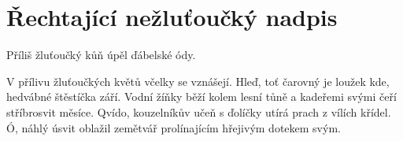 \section*{Řechtající nežluťoučký nadpis}

Příliš žluťoučký kůň úpěl ďábelské ódy.

V přílivu žluťoučkých květů včelky se vznášejí.
Hleď, toť čarovný je loužek kde, hedvábné štěstíčka září.
Vodní žíňky běží kolem lesní tůně a kadeřemi svými čeří stříbrosvit měsíce.
Qvído, kouzelníkův učeň s ďolíčky utírá prach z vílích křídel.
Ó, náhlý úsvit oblažil zemětvář prolínajícím hřejivým dotekem svým.
